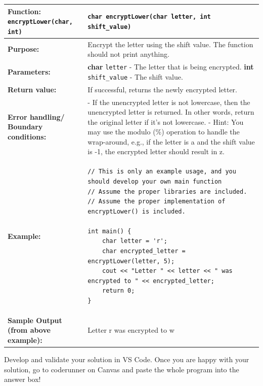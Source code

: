 \bigbreak

\begin{longtable}{|p{1.7in}|p{4.0in}|}
\hline
\textbf{Function:} \texttt{encryptLower(char, int)} & \texttt{char encryptLower(char letter, int shift_value)}\\ \hline

\textbf{Purpose:} & Encrypt the letter using the shift value. The function should not print anything. \\ \hline

\textbf{Parameters:} & 
\textbf{char} \texttt{letter} - The letter that is being encrypted. \newline
\textbf{int} \texttt{shift\_value} - The shift value. \\ \hline

\textbf{Return value:} & If successful, returns the newly encrypted letter. \\ \hline

\textbf{Error handling/} \newline
\textbf{Boundary conditions:} & 
- If the unencrypted letter is not lowercase, then the unencrypted letter is returned. In other words, return the original letter if it's not lowercase. \newline 
- Hint: You may use the modulo (\%) operation to handle the wrap-around, e.g., if the letter is a and the shift value is -1, the encrypted letter should result in z. \\ \hline

\textbf{Example:} & 
\begin{verbatim}
// This is only an example usage, and you should develop your own main function
// Assume the proper libraries are included.
// Assume the proper implementation of encryptLower() is included.

int main() {
    char letter = 'r';
    char encrypted_letter = encryptLower(letter, 5);
    cout << "Letter " << letter << " was encrypted to " << encrypted_letter;
    return 0;
}

\end{verbatim} 

\\ \hline

\textbf{Sample Output (from above example):} & Letter r was encrypted to w \\ \hline

\end{longtable}

Develop and validate your solution in VS Code. Once you are happy with your solution, go to coderunner on Canvas and paste the whole program into the answer box! 


